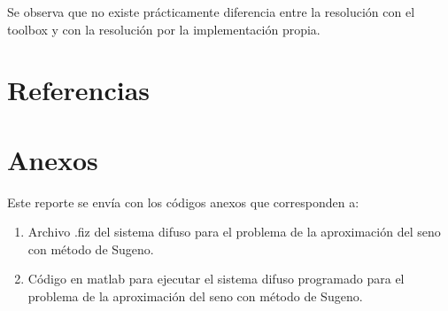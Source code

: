 \documentclass[11pt, letterpaper]{article}
\begin{document}
Se observa que no existe prácticamente diferencia entre la resolución con el toolbox y con la resolución por la implementación propia.

\newpage

\section{Referencias}


\newpage

\section{Anexos}

Este reporte se envía con los códigos anexos que corresponden a:

\begin{enumerate}
	\item Archivo .fiz del sistema difuso para el problema de la aproximación del seno con método de Sugeno.
	\item Código en matlab para ejecutar el sistema difuso programado para el problema de la aproximación del seno con método de Sugeno.

\end{enumerate}
\end{document}
